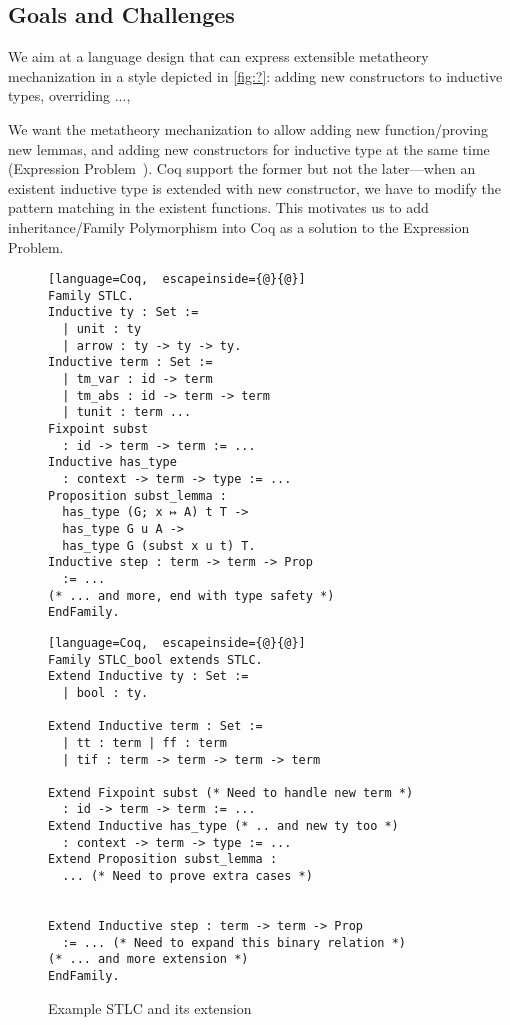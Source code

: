 \subsection{Goals and Challenges}

We aim at a language design that can express extensible metatheory
mechanization in a style depicted in \cref{fig:?}:
adding new constructors to inductive types, overriding ..., 

\newpage

We want the metatheory mechanization to allow adding new
function/proving new lemmas, and adding new constructors for inductive
type at the same time  (Expression Problem~\cite{wadler-ep}). Coq
support the former but not the later---when an existent inductive type
is extended with new constructor, we have to modify the pattern matching
in the existent functions. This motivates us to add inheritance/Family
Polymorphism into Coq as a solution to the Expression Problem. 

\begin{figure}[!htb]
  \begin{minipage}[t]{0.47\linewidth}
\begin{lstlisting}[language=Coq,  escapeinside={@}{@}]
Family STLC.
Inductive ty : Set :=
  | unit : ty
  | arrow : ty -> ty -> ty.
Inductive term : Set := 
  | tm_var : id -> term 
  | tm_abs : id -> term -> term 
  | tunit : term ...
Fixpoint subst 
  : id -> term -> term := ...
Inductive has_type 
  : context -> term -> type := ...
Proposition subst_lemma :
  has_type (G; x ↦ A) t T ->
  has_type G u A ->
  has_type G (subst x u t) T.
Inductive step : term -> term -> Prop 
  := ...
(* ... and more, end with type safety *)
EndFamily.
\end{lstlisting}
  \end{minipage}
  \begin{minipage}[t]{0.47\linewidth}
\begin{lstlisting}[language=Coq,  escapeinside={@}{@}]
Family STLC_bool extends STLC.
Extend Inductive ty : Set :=
  | bool : ty.

Extend Inductive term : Set := 
  | tt : term | ff : term 
  | tif : term -> term -> term -> term

Extend Fixpoint subst (* Need to handle new term *)
  : id -> term -> term := ...
Extend Inductive has_type (* .. and new ty too *)
  : context -> term -> type := ...
Extend Proposition subst_lemma :
  ... (* Need to prove extra cases *)


Extend Inductive step : term -> term -> Prop 
  := ... (* Need to expand this binary relation *)
(* ... and more extension *)
EndFamily.
\end{lstlisting}
  \end{minipage}
  \caption{Example STLC and its extension}\label{fig:STLC-example}
\end{figure}

